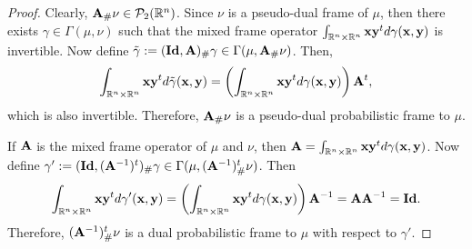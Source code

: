 \documentclass{amsart}
\numberwithin{equation}{section}
\theoremstyle{plain}
\theoremstyle{remark}
\theoremstyle{definition}
\begin{document}
\begin{proof}
  Clearly, ${\bf A}_\# \nu \in \mathcal{P}_2(\mathbb{R}^n)$. Since $\nu$ is a pseudo-dual frame of $\mu$, then there exists $\gamma \in \Gamma(\mu, \nu)$ such that the mixed frame operator $\int_{\mathbb{R}^n \times \mathbb{R}^n} {\bf x}{\bf y}^t d\gamma({\bf x, y})$ is invertible. Now define $\Tilde{\gamma} := ({\bf Id}, {\bf A})_\# \gamma \in \Gamma(\mu, {\bf A}_\# \nu)$. Then,
    $$\int_{\mathbb{R}^n \times \mathbb{R}^n} {\bf x}{\bf y}^t d\Tilde{\gamma}({\bf x, y}) = \left(\int_{\mathbb{R}^n \times \mathbb{R}^n} {\bf x}{\bf y}^t d\gamma({\bf x, y}) \right) {\bf A}^t,$$
    which is also invertible. Therefore, ${\bf A}_\# \nu$ is a pseudo-dual probabilistic frame to $\mu$. 
    
    If ${\bf A}$ is  the mixed frame operator of $\mu$ and $\nu$, then 
    ${\bf A} = \int_{\mathbb{R}^n \times \mathbb{R}^n} {\bf x}{\bf y}^t d\gamma({\bf x, y})$. Now define $\gamma' := ({\bf Id}, ({\bf A}^{-1})^t)_\# \gamma \in \Gamma(\mu, ({\bf A}^{-1})^t_\# \nu)$. Then
    $$\int_{\mathbb{R}^n \times \mathbb{R}^n} {\bf x}{\bf y}^t d \gamma'({\bf x, y}) =  \left(\int_{\mathbb{R}^n \times \mathbb{R}^n} {\bf x}{\bf y}^t d\gamma({\bf x, y}) \right) {\bf A}^{-1}=  {\bf A} {\bf A}^{-1} = {\bf Id}.$$
    Therefore, $({\bf A}^{-1})^t_\# \nu$ is a dual probabilistic frame to $\mu$ with respect to $\gamma'$. 
\end{proof}
\end{document}
